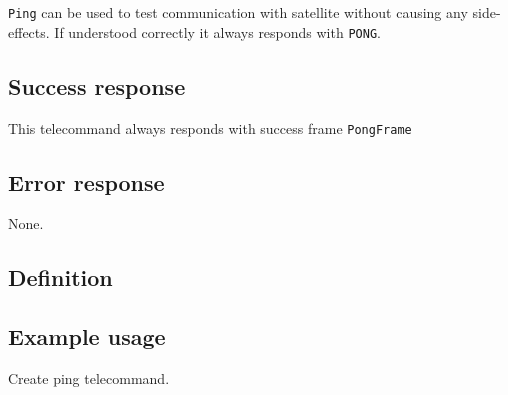 \texttt{Ping} can be used to test communication with satellite without causing any side-effects. If understood correctly it always responds with \texttt{PONG}.

\subsection{Success response}
This telecommand always responds with success frame \texttt{PongFrame}

\subsection{Error response}
None.

\subsection{Definition}


\subsection{Example usage}
Create ping telecommand.

